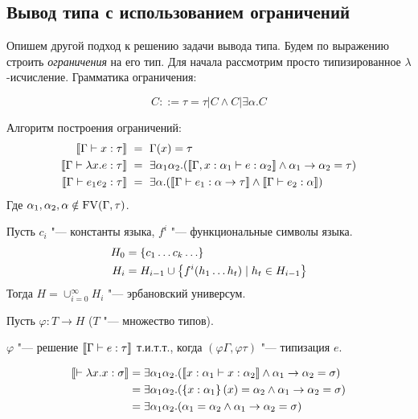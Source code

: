 \subsection*{\texorpdfstring{Вывод типа с использованием ограничений}{Constraint-based type inference}}
\todo
Опишем другой подход к решению задачи вывода типа.
Будем по выражению строить \emph{ограничения} на его тип.
Для начала рассмотрим просто типизированное $\lambda$-исчисление.
Грамматика ограничения:
\begin{bnf}
\[
    C ::= \tau = \tau | C \land C | \exists \alpha . C
\]
\end{bnf}%
Алгоритм построения ограничений:
\begin{align*}
    \restr{\Gamma \vdash x : \tau} \ &=\  \Gamma(x) = \tau \\
    \restr{\Gamma \vdash \lambda x . e : \tau} \ &=\ 
        \exists \alpha_1 \alpha_2 . (\restr{\Gamma, x : \alpha_1\vdash e:\alpha_2} \land \alpha_1\rightarrow\alpha_2=\tau) \\
    \restr{\Gamma \vdash e_1 e_2 : \tau} \ &=\ 
        \exists\alpha.(\restr{\Gamma\vdash e_1 :\alpha\rightarrow\tau} \land \restr{\Gamma\vdash e_2 : \alpha})
\end{align*}
Где $\alpha_1, \alpha_2, \alpha \notin \operatorname{FV}(\Gamma, \tau)$.

\begin{definition}
    Пусть $c_i$ "--- константы языка, $f^i$ "--- функциональные символы языка.
    \begin{align*}
        H_0 &= \left\{c_1 \ldots c_k \ldots\right\} \\
        H_i &= H_{i-1} \cup \left\{f^i(h_1 \ldots h_t) \mid h_t \in H_{i-1}\right\}
    \end{align*}
    Тогда $H = \cup_{i=0}^{\infty} H_i$ "--- эрбановский универсум.
\end{definition}

Пусть $\varphi : T \rightarrow H$ ($T$ "--- множество типов).

\begin{theorem}
    $\varphi$ "--- решение $\llbracket\Gamma\vdash e : \tau\rrbracket$ т.и.т.т., когда $(\varphi\Gamma, \varphi\tau)$ "--- типизация $e$.
\end{theorem}

\begin{example}
    \begin{align*}
        \llbracket\vdash \lambda x . x : \sigma\rrbracket
        &= \exists \alpha_1 \alpha_2. (\llbracket x : \alpha_1 \vdash x : \alpha_2\rrbracket \land \alpha_1\rightarrow\alpha_2 = \sigma) \\
        &= \exists \alpha_1 \alpha_2. (\left\{x : \alpha_1\right\}(x) = \alpha_2 \land \alpha_1\rightarrow\alpha_2 = \sigma) \\
        &= \exists \alpha_1 \alpha_2. (\alpha_1 = \alpha_2 \land \alpha_1\rightarrow\alpha_2 = \sigma)
    \end{align*}
\end{example}

